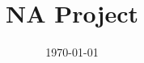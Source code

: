 \documentclass{source/Report}
\title{NA Project}
\date{\today}
\begin{document}
    \makecover
    \makeheader
    
    
    
        


\end{document}

